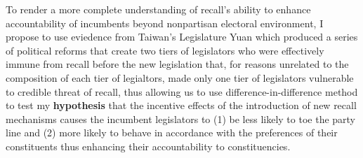 \documentclass[hyphens, crop=false]{standalone}
\begin{document}

	To render a more complete understanding of recall's ability to enhance accountability of incumbents
	beyond nonpartisan electoral environment,
	I propose to use eviedence from Taiwan's Legislature Yuan which produced a series of political reforms that create two tiers of legislators who were effectively immune from recall before the new legislation that, for reasons unrelated to the composition of each tier of legialtors,
	made only one tier of legislators vulnerable to credible threat of recall,
	thus allowing us to use difference-in-difference method to test my \textbf{hypothesis} that the incentive effects of the introduction of new recall mechanisms causes the incumbent legislators to 
	(1) be less likely to toe the party line
	and
	(2)
	more likely to behave in accordance with the preferences of their constituents
	thus enhancing their accountability to constituencies.
	
\end{document}
